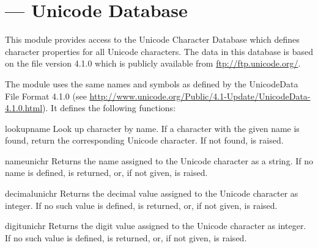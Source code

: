 \section{ ---
         Unicode Database}



This module provides access to the Unicode Character Database which
defines character properties for all Unicode characters. The data in
this database is based on the  file version
4.1.0 which is publicly available from \url{ftp://ftp.unicode.org/}.

The module uses the same names and symbols as defined by the
UnicodeData File Format 4.1.0 (see
\url{http://www.unicode.org/Public/4.1-Update/UnicodeData-4.1.0.html}).  It
defines the following functions:

\begin{funcdesc}{lookup}{name}
  Look up character by name.  If a character with the
  given name is found, return the corresponding Unicode
  character.  If not found,  is raised.
\end{funcdesc}

\begin{funcdesc}{name}{unichr}
  Returns the name assigned to the Unicode character
   as a string. If no name is defined,
   is returned, or, if not given,
   is raised.
\end{funcdesc}

\begin{funcdesc}{decimal}{unichr}
  Returns the decimal value assigned to the Unicode character
   as integer. If no such value is defined,
   is returned, or, if not given,
   is raised.
\end{funcdesc}

\begin{funcdesc}{digit}{unichr}
  Returns the digit value assigned to the Unicode character
   as integer. If no such value is defined,
   is returned, or, if not given,
   is raised.
\end{funcdesc}

